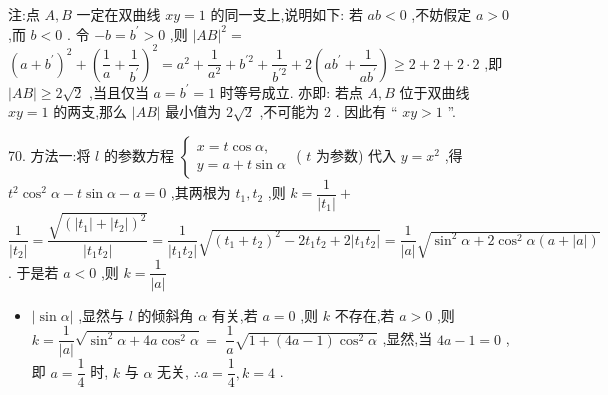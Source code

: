 注:点 $A,B$ 一定在双曲线 ${xy} = 1$ 的同一支上,说明如下: 若 ${ab} < 0$ ,不妨假定 $a > 0$ ,而 $b < 0$ . 令 $- b = {b}^{\prime } > 0$ ,则 ${\left| AB\right| }^{2} =$  ${\left( a + {b}^{\prime }\right) }^{2} + {\left( \dfrac{1}{a} + \dfrac{1}{{b}^{\prime }}\right) }^{2} = {a}^{2} + \dfrac{1}{{a}^{2}} + {b}^{\prime 2} + \dfrac{1}{{b}^{\prime 2}} + 2\left( {a{b}^{\prime } + \dfrac{1}{a{b}^{\prime }}}\right)  \geq  2 + 2 + 2 \cdot  2$ ,即 $\left| {AB}\right|  \geq  2\sqrt{2}$ ,当且仅当 $a = {b}^{\prime } = 1$ 时等号成立. 亦即: 若点 $A,B$ 位于双曲线 ${xy} = 1$ 的两支,那么 $\left| {AB}\right|$ 最小值为 $2\sqrt{2}$ ,不可能为 2 . 因此有 “ ${xy} > 1$ ”.

70. 方法一:将 $l$ 的参数方程 $\left\{  \begin{array}{l} x = t\cos \alpha , \\  y = a + t\sin \alpha  \end{array}\right.$ ( $t$ 为参数) 代入 $y = {x}^{2}$ ,得 ${t}^{2}{\cos }^{2}\alpha  - t\sin \alpha  - a = 0$ ,其两根为 ${t}_{1},{t}_{2}$ ,则 $k = \dfrac{1}{\left| {t}_{1}\right| } +$  $\dfrac{1}{\left| {t}_{2}\right| } = \dfrac{\sqrt{{\left( \left| {t}_{1}\right|  + \left| {t}_{2}\right| \right) }^{2}}}{\left| {t}_{1}{t}_{2}\right| } = \dfrac{1}{\left| {t}_{1}{t}_{2}\right| }\sqrt{{\left( {t}_{1} + {t}_{2}\right) }^{2} - 2{t}_{1}{t}_{2} + 2\left| {{t}_{1}{t}_{2}}\right| } = \dfrac{1}{\left| a\right| }\sqrt{{\sin }^{2}\alpha  + 2{\cos }^{2}\alpha \left( {a + \left| a\right| }\right) }$ . 于是若 $a < 0$ ,则 $k = \dfrac{1}{\left| a\right| }$

\begin{itemize}
\item $\left| {\sin \alpha }\right|$ ,显然与 $l$ 的倾斜角 $\alpha$ 有关,若 $a = 0$ ,则 $k$ 不存在,若 $a > 0$ ,则 $k = \dfrac{1}{\left| a\right| }\sqrt{{\sin }^{2}\alpha  + {4a}{\cos }^{2}\alpha } =$  $\dfrac{1}{a}\sqrt{1 + \left( {{4a} - 1}\right) {\cos }^{2}\alpha }$ ,显然,当 ${4a} - 1 = 0$ ,即 $a = \dfrac{1}{4}$ 时, $k$ 与 $\alpha$ 无关, $\therefore a = \dfrac{1}{4},k = 4$ .
\end{itemize}

